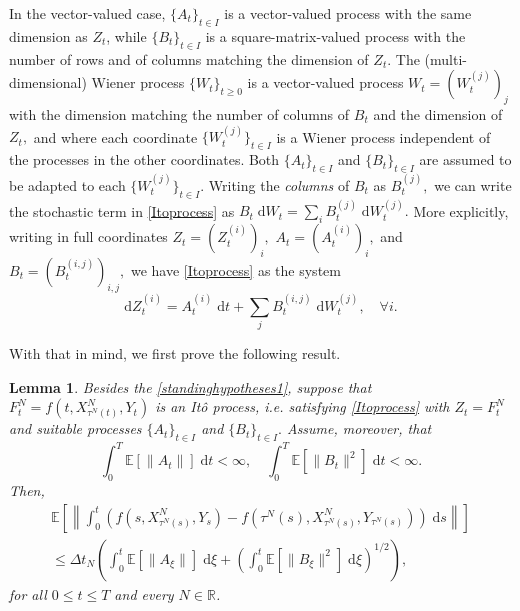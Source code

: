 \documentclass[reqno,12pt]{amsart}
\theoremstyle{plain} %
\newtheorem{lemma}{Lemma}[section]
\theoremstyle{definition} %
\begin{document}
In the vector-valued case, $\{A_t\}_{t\in I}$ is a vector-valued process with the same dimension as $Z_t$, while $\{B_t\}_{t\in I}$ is a square-matrix-valued process with the number of rows and of columns matching the dimension of $Z_t.$ The (multi-dimensional) Wiener process $\{W_t\}_{t\geq 0}$ is a vector-valued process $W_t = (W_t^{(j)})_j$ with the dimension matching the number of columns of $B_t$ and the dimension of $Z_t,$ and where each coordinate $\{W_t^{(j)}\}_{t\in I}$ is a Wiener process independent of the processes in the other coordinates. Both $\{A_t\}_{t\in I}$ and $\{B_t\}_{t\in I}$ are assumed to be adapted to each $\{W_t^{(j)}\}_{t\in I}.$ Writing the \emph{columns} of $B_t$ as $B_t^{(j)},$ we can write the stochastic term in \eqref{Itoprocess} as $B_t\;\mathrm{d}W_t = \sum_i B_t^{(j)}\;\mathrm{d}W_t^{(j)}.$ More explicitly, writing in full coordinates $Z_t = (Z_t^{(i)})_i,$ $A_t = (A_t^{(i)})_i,$ and $B_t = (B_t^{(i, j)})_{i, j},$ we have \eqref{Itoprocess} as the system
\begin{equation}
    \label{Itoprocesssystem}
    \mathrm{d}Z_t^{(i)} = A_t^{(i)}\;\mathrm{d}t + \sum_j B_t^{(i, j)}\;\mathrm{d}W_t^{(j)}, \quad \forall i.
\end{equation}

With that in mind, we first prove the following result.
\begin{lemma}
    \label{lemItostep}
    Besides the \cref{standinghypotheses1}, suppose that $F_t^N = f(t, X_{\tau^N(t)}^N, Y_t)$ is an It\^o process, i.e. satisfying \eqref{Itoprocess} with $Z_t = F_t^N$ and suitable processes $\{A_t\}_{t\in I}$ and $\{B_t\}_{t\in I}.$ Assume, moreover, that
    \begin{equation}
        \label{expectItostepterms}
        \int_0^T \mathbb{E}[\|A_t\|] \;\mathrm{d}t < \infty, \quad \int_0^T \mathbb{E}[\|B_t\|^2] \;\mathrm{d}t < \infty.
    \end{equation}
    Then,
    \begin{multline}
        \label{expectintfboundbyIto}
        \mathbb{E}\left[\left\|\int_0^t \left(f(s, X_{\tau^N(s)}^N, Y_s) - f(\tau^N(s), X_{\tau^N(s)}^N, Y_{\tau^N(s)})\right)\;\mathrm{d}s\right\|\right]  \\
        \leq \Delta t_N \left(\int_0^t \mathbb{E}[\|A_\xi\|] \;\mathrm{d}\xi + \left(\int_0^t \mathbb{E}[\|B_\xi\|^2] \;\mathrm{d}\xi \right)^{1/2}\right),
    \end{multline}
    for all $0 \leq t \leq T$ and every $N\in \mathbb{R}$.
\end{lemma}
\end{document}
